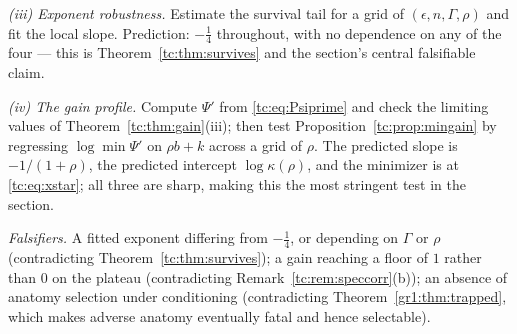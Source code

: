 \documentclass[11pt]{article}
\newcommand{\PrintRefs}{\printbibliography[title={References}]}%
\newcommand{\PrintRefs}{}%
\numberwithin{equation}{section}
\theoremstyle{plain}
\theoremstyle{definition}
\theoremstyle{remark}
\begin{document}
\emph{(iii) Exponent robustness.} Estimate the survival tail for a grid
of $(\epsilon,n,\Gamma,\rho)$ and fit the local slope. Prediction:
$-\tfrac14$ throughout, with no dependence on any of the four ---
this is Theorem~\ref{tc:thm:survives} and the section's central
falsifiable claim.

\emph{(iv) The gain profile.} Compute $\Psi'$ from
\eqref{tc:eq:Psiprime} and check the limiting values of
Theorem~\ref{tc:thm:gain}(iii); then test
Proposition~\ref{tc:prop:mingain} by regressing $\log\min\Psi'$ on
$\rho b+k$ across a grid of $\rho$. The predicted slope is
$-1/(1+\rho)$, the
predicted intercept $\log\kappa(\rho)$, and the minimizer is at
\eqref{tc:eq:xstar}; all three are sharp, making this the most stringent
test in the section.

\emph{Falsifiers.} A fitted exponent differing from $-\tfrac14$, or
depending on $\Gamma$ or $\rho$ (contradicting
Theorem~\ref{tc:thm:survives}); a gain reaching a floor of $1$ rather
than $0$ on the plateau (contradicting
Remark~\ref{tc:rem:speccorr}(b)); an absence of anatomy selection under
conditioning (contradicting Theorem~\ref{gr1:thm:trapped}, which makes
adverse anatomy eventually fatal and hence selectable).


\PrintRefs
\end{document}

